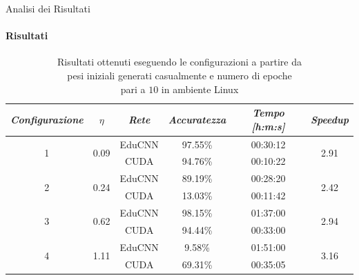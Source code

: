 \documentclass[
 ]{beamer}
\begin{document}
\begin{frame}{Analisi dei Risultati}
    \framesubtitle{Risultati}

        \begin{table}
            \centering
            \renewcommand\arraystretch{1.3}
            \small
            \begin{tabular}{| c | c | c | c | c | c |}
                \hline
                \emph{Configurazione} & $\eta$ & \emph{Rete} & \emph{Accuratezza} & \emph{Tempo [h:m:s]} & \emph{Speedup} \\
                \hline
                \multirow{2}{*}{1} & \multirow{2}{*}{0.09} & EduCNN & 97.55\% & 00:30:12 & \multirow{2}{*}{2.91} \\ \cline{3-5} 
                                   &                       & CUDA   & 94.76\% & 00:10:22 & \\
                \hline
                \multirow{2}{*}{2} & \multirow{2}{*}{0.24} & EduCNN & 89.19\% & 00:28:20 & \multirow{2}{*}{2.42} \\ \cline{3-5} 
                                   &                       & CUDA   & 13.03\% & 00:11:42 & \\
                \hline
                \multirow{2}{*}{3} & \multirow{2}{*}{0.62} & EduCNN & 98.15\% & 01:37:00 & \multirow{2}{*}{2.94} \\ \cline{3-5} 
                                   &                       & CUDA   & 94.44\% & 00:33:00 & \\
                \hline
                \multirow{2}{*}{4} & \multirow{2}{*}{1.11} & EduCNN & 9.58\% & 01:51:00 & \multirow{2}{*}{3.16} \\ \cline{3-5} 
                                   &                       & CUDA   & 69.31\% & 00:35:05 & \\
                \hline
            \end{tabular}
            \caption            
    {Risultati ottenuti eseguendo le configurazioni a partire da \\ pesi iniziali generati casualmente e numero di epoche \\ pari a $10$ in ambiente Linux \endtabular}                  
        \end{table}    
\end{frame}
\end{document}
